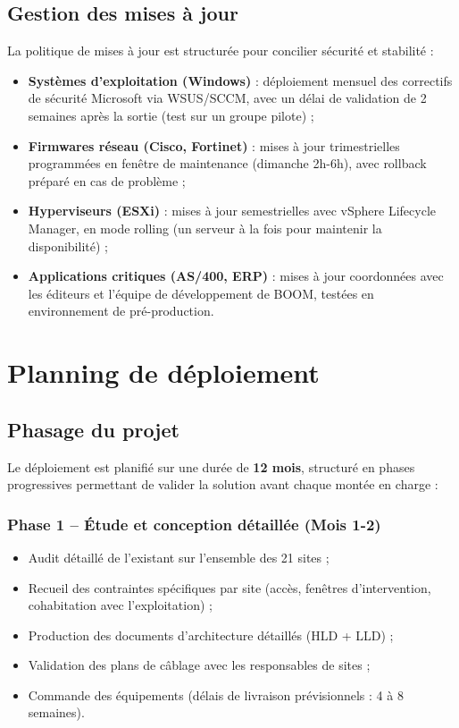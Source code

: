 \documentclass[12pt,a4paper]{report}
\begin{document}
\section{Gestion des mises à jour}

La politique de mises à jour est structurée pour concilier sécurité et stabilité :

\begin{itemize}
\item \textbf{Systèmes d'exploitation (Windows)} : déploiement mensuel des correctifs de sécurité Microsoft via WSUS/SCCM, avec un délai de validation de 2 semaines après la sortie (test sur un groupe pilote) ;
\item \textbf{Firmwares réseau (Cisco, Fortinet)} : mises à jour trimestrielles programmées en fenêtre de maintenance (dimanche 2h-6h), avec rollback préparé en cas de problème ;
\item \textbf{Hyperviseurs (ESXi)} : mises à jour semestrielles avec vSphere Lifecycle Manager, en mode rolling (un serveur à la fois pour maintenir la disponibilité) ;
\item \textbf{Applications critiques (AS/400, ERP)} : mises à jour coordonnées avec les éditeurs et l'équipe de développement de BOOM, testées en environnement de pré-production.
\end{itemize}


\chapter{Planning de déploiement}

\section{Phasage du projet}

Le déploiement est planifié sur une durée de \textbf{12 mois}, structuré en phases progressives permettant de valider la solution avant chaque montée en charge :

\subsection{Phase 1 -- Étude et conception détaillée (Mois 1-2)}

\begin{itemize}
\item Audit détaillé de l'existant sur l'ensemble des 21 sites ;
\item Recueil des contraintes spécifiques par site (accès, fenêtres d'intervention, cohabitation avec l'exploitation) ;
\item Production des documents d'architecture détaillés (HLD + LLD) ;
\item Validation des plans de câblage avec les responsables de sites ;
\item Commande des équipements (délais de livraison prévisionnels : 4 à 8 semaines).
\end{itemize}
\end{document}
